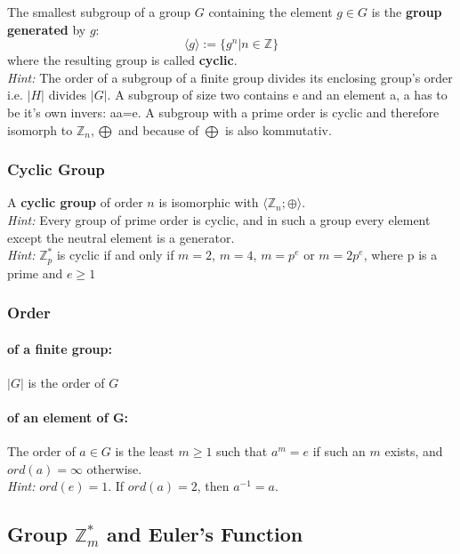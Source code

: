 \documentclass[11pt]{article}
\begin{document}
The smallest subgroup of a group $G$ containing the element $g \in G$ is the \textbf{group generated} by $g$:
\begin{equation*}
	\langle g \rangle := \{g^n | n \in \mathbb{Z} \}
\end{equation*}
where the resulting group is called \textbf{cyclic}.\\

\emph{Hint:} The order of a subgroup of a finite group divides its enclosing group's order i.e. $|H|$ divides $|G|$. A subgroup of size two contains e and an element a, a has to be it's own invers: aa=e. A subgroup with a prime order is cyclic and therefore isomorph to $\mathbb{Z}_n,\bigoplus$ and because of $\bigoplus$ is also kommutativ.

\subsubsection{Cyclic Group}

A \textbf{cyclic group} of order $n$ is isomorphic with $\langle \mathbb{Z}_n;\oplus\rangle$. \\

\emph{Hint:} Every group of prime order is cyclic, and in such a group every element except the neutral element is a generator. \\
\emph{Hint:} $\mathbb{Z}_p^*$ is cyclic if and only if $m=2$, $m = 4$, $m = p^e$ or $m = 2p^e$, where p is a prime and $e \geq 1$

\subsubsection{Order}

\paragraph{of a finite group:} $|G|$ is the order of $G$ 
\paragraph{of an element of G:}
The order of $a \in G$ is the least $m \geq 1$ such that $a^m = e$ if such an $m$ exists, and $ord(a) = \infty$ otherwise. \\
\emph{Hint:}  $ord(e) = 1$. If $ord(a) = 2$, then $a^{-1} = a$.

\subsection{Group $\mathbb{Z}_m^*$ and Euler's Function}
\end{document}
